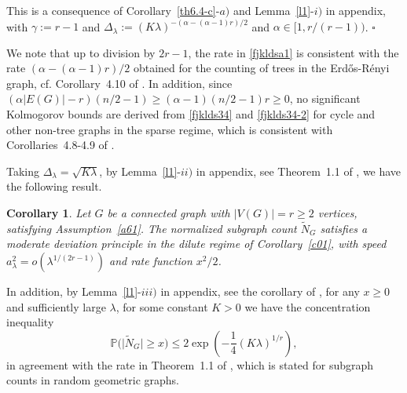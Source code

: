 \documentclass[12pt]{article}
\newtheorem{corollary}[prop]{Corollary}
\def\P{\mathbb{P}}
\newenvironment{Proof}{\removelastskip\par\medskip
\noindent{\em Proof.} \rm}{\penalty-20\null\hfill$\square$\par\medbreak}
\numberwithin{equation}{section}
\begin{document}
\begin{Proof}
  This is a consequence of 
  Corollary~\ref{th6.4-c}-$a)$
  and Lemma~\ref{l1}-$i)$ in appendix,
  with $\gamma :=r-1$ and 
  $\Delta_\lambda:=
  (K \lambda )^{ - (
 \alpha   -(\alpha - 1)r 
    )/2}$
  and $\alpha \in [1, r/(r-1) )$. 
\end{Proof} 
  We note that  up to division by $2r - 1$,
   the rate in \eqref{fjkldsa1} is consistent  
 with the rate $(
 \alpha    -(\alpha - 1)r 
     ) / 2$ obtained for the counting of trees in the
 Erd{\H o}s-R\'enyi graph, cf. Corollary~4.10 of \cite{PS2}. 
 In addition, since 
$
(\alpha |E(G)|-r)(n/2-1)
\geq
(\alpha -1)(n/2-1)r \geq 0$,
no significant Kolmogorov bounds
are derived from \eqref{fjklds34}
and \eqref{fjklds34-2} 
for cycle and other non-tree graphs 
in the sparse regime,
which is consistent with
Corollaries~4.8-4.9 of \cite{PS2}. 

\medskip

 Taking $\Delta_\lambda = \sqrt{K \lambda}$, 
 by Lemma~\ref{l1}-$ii)$ in appendix, see Theorem~1.1 of \cite{doring},
we have the following result. 
\begin{corollary} %
  \label{c01-2-0}
  Let $G$ be a connected graph with $|V(G)| = r \geq 2$ vertices,
  satisfying Assumption~\ref{a61}. 
  The normalized subgraph count $\widetilde{N}_G$
    satisfies a moderate deviation principle
  in the dilute regime of Corollary~\ref{c01}, 
  with speed $a_\lambda^2 = o( \lambda^{1/(2r - 1)} )$ and rate function $x^2/2$.
\end{corollary}
In addition,
by Lemma~\ref{l1}-$iii)$ in appendix,
see the corollary of \cite[Lemma~2.4]{saulis},
for any $x\ge0$ and sufficiently large $\lambda$,
for some constant $K>0$ 
we have the concentration inequality 
\begin{equation}
\label{concentrationineq}
  \P \big( \big| \widetilde{N}_G \big|
  \geq x)\le2\exp\left(-
  \frac{1}{4} 
   ( K \lambda)^{1/r}
   \right), 
\end{equation} 
in agreement with the rate in Theorem~1.1 of \cite{bachmann},
which is stated for subgraph counts in random geometric
graphs. 
\end{document}
